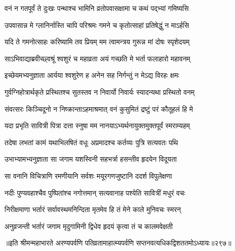 \begin{center}



\twolineshloka
{वनं न गतपूर्वं ते दुःखः पन्थाश्च भामिनि}
{व्रतोपवासक्षामा च कथं पद्भ्यां गमिष्यसि}




\twolineshloka
{उपवासान्न मे ग्लानिर्नास्ति चापि परिश्रमः}
{गमने च कृतोत्साहां प्रतिषेद्धुं न माऽर्हसि}




\twolineshloka
{यदि ते गमनोत्साहः करिष्यामि तव प्रियम्}
{मम त्वामन्त्रय गुरून्न मां दोषः स्पृशेदयम्}




\twolineshloka
{साऽभिवाद्याब्रवीच्छ्वश्रूं श्वशुरं च महाव्रता}
{अयं गच्छति मे भर्ता फलाहारो महावनम्}


\twolineshloka
{इच्छेयमभ्यनुज्ञाता आर्यया श्वशुरेण ह}
{अनेन सह निर्गन्तुं न मेऽद्य विरहः क्षमः}


\twolineshloka
{गुर्वग्निहोत्रार्थकृते प्रस्थितश्च सुतस्तव}
{न निवार्यो निवार्यः स्यादन्यथा प्रस्थितो वनम्}


\twolineshloka
{संवत्सरः किञ्चिदूनो न निष्क्रान्ताऽहमाश्रमात्}
{वनं कुसुमितं द्रष्टुं परं कौतूहलं हि मे}




\twolineshloka
{यदा प्रभृति सावित्री पित्रा दत्ता स्नुषा मम}
{नानयाऽभ्यर्थनायुक्तमुक्तपूर्वं स्मराम्यहम्}


\twolineshloka
{तदेषा लभतां कामं यथाभिलषितं वधूः}
{अप्रमादश्च कर्तव्यः पुत्रि सत्यवतः पथि}




\twolineshloka
{उभाभ्यामभ्यनुज्ञाता सा जगाम यशस्विनी}
{सहभर्त्रा हसन्तीव हृदयेन विदूयता}


\twolineshloka
{सा वनानि विचित्राणि रमणीयानि सर्वशः}
{मयूरगणजुष्टानि ददर्श विपुलेक्षणा}


\twolineshloka
{नदीः पुण्यवहाश्चैव पुष्पितांश्च नगोत्तमान्}
{सत्यवानाह पश्येति सावित्रीं मधुरं वचः}


\twolineshloka
{निरीक्षमाणा भर्तारं सर्वावस्थमनिन्दिता}
{मृतमेव हि तं मेने काले मुनिवचः स्मरन्}


\twolineshloka
{अनुव्रजन्ती भर्तारं जगाम मृदुगामिनी}
{द्विधेव हृदयं कृत्वा तं च कालमवेक्षती}


॥इति श्रीमन्महाभारते अरण्यपर्वणि
पतिव्रतामाहात्म्यपर्वणि सप्तनवत्यधिकद्विशततमोऽध्यायः॥२९७॥



\end{center}

